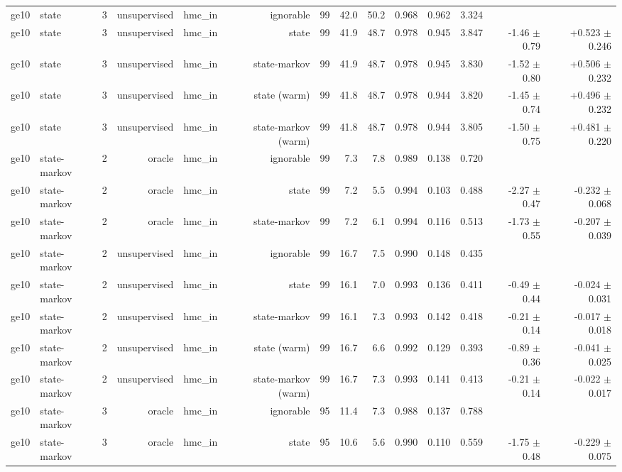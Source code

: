 \begin{table}[ht]
\begin{tabular}{llrrrrrrrrrrrr}
ge10 & state & 3 & unsupervised & hmc\_in & ignorable & 99 & 42.0 & 50.2 & 0.968 & 0.962 & 3.324 &  &  \\
ge10 & state & 3 & unsupervised & hmc\_in & state & 99 & 41.9 & 48.7 & 0.978 & 0.945 & 3.847 & -1.46 $\pm$ 0.79 & +0.523 $\pm$ 0.246 \\
ge10 & state & 3 & unsupervised & hmc\_in & state-markov & 99 & 41.9 & 48.7 & 0.978 & 0.945 & 3.830 & -1.52 $\pm$ 0.80 & +0.506 $\pm$ 0.232 \\
ge10 & state & 3 & unsupervised & hmc\_in & state (warm) & 99 & 41.8 & 48.7 & 0.978 & 0.944 & 3.820 & -1.45 $\pm$ 0.74 & +0.496 $\pm$ 0.232 \\
ge10 & state & 3 & unsupervised & hmc\_in & state-markov (warm) & 99 & 41.8 & 48.7 & 0.978 & 0.944 & 3.805 & -1.50 $\pm$ 0.75 & +0.481 $\pm$ 0.220 \\
ge10 & state-markov & 2 & oracle & hmc\_in & ignorable & 99 & 7.3 & 7.8 & 0.989 & 0.138 & 0.720 &  &  \\
ge10 & state-markov & 2 & oracle & hmc\_in & state & 99 & 7.2 & 5.5 & 0.994 & 0.103 & 0.488 & -2.27 $\pm$ 0.47 & -0.232 $\pm$ 0.068 \\
ge10 & state-markov & 2 & oracle & hmc\_in & state-markov & 99 & 7.2 & 6.1 & 0.994 & 0.116 & 0.513 & -1.73 $\pm$ 0.55 & -0.207 $\pm$ 0.039 \\
ge10 & state-markov & 2 & unsupervised & hmc\_in & ignorable & 99 & 16.7 & 7.5 & 0.990 & 0.148 & 0.435 &  &  \\
ge10 & state-markov & 2 & unsupervised & hmc\_in & state & 99 & 16.1 & 7.0 & 0.993 & 0.136 & 0.411 & -0.49 $\pm$ 0.44 & -0.024 $\pm$ 0.031 \\
ge10 & state-markov & 2 & unsupervised & hmc\_in & state-markov & 99 & 16.1 & 7.3 & 0.993 & 0.142 & 0.418 & -0.21 $\pm$ 0.14 & -0.017 $\pm$ 0.018 \\
ge10 & state-markov & 2 & unsupervised & hmc\_in & state (warm) & 99 & 16.7 & 6.6 & 0.992 & 0.129 & 0.393 & -0.89 $\pm$ 0.36 & -0.041 $\pm$ 0.025 \\
ge10 & state-markov & 2 & unsupervised & hmc\_in & state-markov (warm) & 99 & 16.7 & 7.3 & 0.993 & 0.141 & 0.413 & -0.21 $\pm$ 0.14 & -0.022 $\pm$ 0.017 \\
ge10 & state-markov & 3 & oracle & hmc\_in & ignorable & 95 & 11.4 & 7.3 & 0.988 & 0.137 & 0.788 &  &  \\
ge10 & state-markov & 3 & oracle & hmc\_in & state & 95 & 10.6 & 5.6 & 0.990 & 0.110 & 0.559 & -1.75 $\pm$ 0.48 & -0.229 $\pm$ 0.075 \\

\end{tabular}
\end{table}
